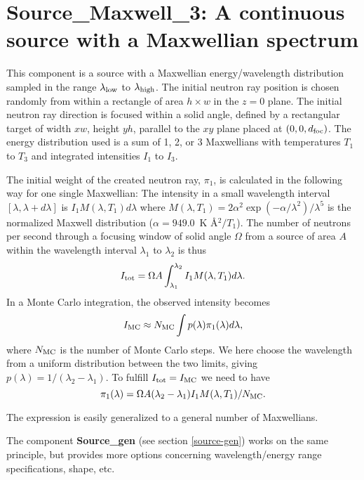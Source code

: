 \section{Source\_Maxwell\_3: A continuous source
with a Maxwellian spectrum}
\label{source-maxwell}


This component is a source with a Maxwellian energy/wavelength distribution
sampled in the range $\lambda_{\rm low}$ to $\lambda_{\rm high}$.
The initial neutron ray position is chosen randomly from within a
rectangle of area $h \times w$ in the $z=0$ plane.
The initial neutron ray direction is focused within
a solid angle, defined by a rectangular target of width
$xw$, height $yh$, parallel to
the $xy$ plane placed at $(0,0,d_{\rm foc})$.
The energy distribution used is a sum of 1, 2, or 3 Maxwellians with
temperatures $T_1$ to $T_3$ and integrated intensities $I_1$ to $I_3$.

The initial weight of the created neutron ray, $\pi_1$, is
calculated in the following way for one single Maxwellian:
The intensity in a small wavelength interval $[\lambda, \lambda+d\lambda]$ is
$ I_1 M(\lambda,T_1) d\lambda $
where
$M(\lambda,T_1) = 2 \alpha^2 \exp(-\alpha/\lambda^2) / \lambda^5 $ 
is the normalized Maxwell distribution ($\alpha=949.0$~K \AA$^2/T_1$).
The number of neutrons per second through a focusing window
of solid angle $\Omega$
from a source of area $A$ within the wavelength interval $\lambda_1$ to
$\lambda_2$ is thus
\begin{equation}
I_{\rm tot} = \Omega A \int_{\lambda_1}^{\lambda_2} I_1 M(\lambda,T_1) d\lambda.
\end{equation}
In a Monte Carlo integration, the observed intensity becomes
\begin{equation}
I_{\rm MC} \approx N_{\rm MC} \int p(\lambda) \pi_1(\lambda) d\lambda ,
\end{equation}
where $N_{\rm MC}$ is the number of Monte Carlo steps.
We here choose the wavelength from a uniform distribution between the two
limits, giving $p(\lambda)=1/(\lambda_2-\lambda_1)$.
To fulfill $I_{\rm tot} = I_{\rm MC}$ we need to have
\begin{equation}
\pi_1(\lambda) = \Omega A (\lambda_2-\lambda_1) I_1 M(\lambda,T_1) / N_{\rm MC} .
\end{equation}

The expression is easily generalized to a general number of Maxwellians.

The component {\bf Source\_gen} (see section \ref{source-gen}) 
works on the same principle, but provides more options concerning 
wavelength/energy range specifications, shape, etc.

